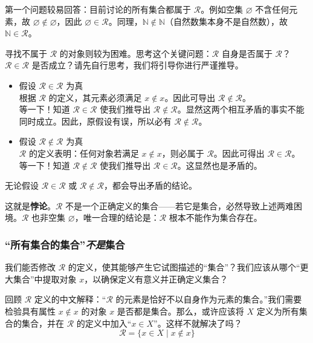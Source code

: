 第一个问题较易回答：目前讨论的所有集合都属于 $\mathcal{R}$。例如空集 $\varnothing$ 不含任何元素，故 $\varnothing \notin \varnothing$，因此 $\varnothing \in \mathcal{R}$。同理，$\mathbb{N} \notin \mathbb{N}$（自然数集本身不是自然数），故 $\mathbb{N} \in \mathcal{R}$。

寻找不属于 $\mathcal{R}$ 的对象则较为困难。思考这个关键问题：$\mathcal{R}$ 自身是否属于 $\mathcal{R}$？$\mathcal{R} \in \mathcal{R}$ 是否成立？请先自行思考，我们将引导你进行严谨推导。

\begin{itemize}
    \item 假设 $\mathcal{R} \in \mathcal{R}$ 为真 \\
    根据 $\mathcal{R}$ 的定义，其元素必须满足 $x \notin x$。因此可导出 $\mathcal{R} \notin \mathcal{R}$。\\
    等一下！知道 $\mathcal{R} \in \mathcal{R}$ 使我们推导出 $\mathcal{R} \notin \mathcal{R}$。显然这两个相互矛盾的事实不能同时成立。因此，原假设有误，所以必有 $\mathcal{R} \notin \mathcal{R}$。
    \item 假设 $\mathcal{R} \notin \mathcal{R}$ 为真 \\
    $\mathcal{R}$ 的定义表明：任何对象若满足 $x \notin x$，则必属于 $\mathcal{R}$。因此可得出 $\mathcal{R} \in \mathcal{R}$。\\
    等一下！知道 $\mathcal{R} \notin \mathcal{R}$ 使我们推导出 $\mathcal{R} \in \mathcal{R}$。这显然也是矛盾的。
\end{itemize}
无论假设 $\mathcal{R} \in \mathcal{R}$ 或 $\mathcal{R} \notin \mathcal{R}$，都会导出矛盾的结论。

这就是\textbf{悖论}。$\mathcal{R}$ 不是一个正确定义的集合——若它是集合，必然导致上述两难困境。$\mathcal{R}$ 也非空集 $\varnothing$，唯一合理的结论是：$\mathcal{R}$ 根本不能作为集合存在。

\subsubsection*{``所有集合的集合''\emph{不是}集合}

我们能否修改 $\mathcal{R}$ 的定义，使其能够产生它试图描述的``集合''？我们应该从哪个``更大集合''中提取对象 $x$，以确保定义有意义并正确定义集合？

回顾 $\mathcal{R}$ 定义的中文解释：``$\mathcal{R}$ 的元素是恰好不以自身作为元素的集合。''我们需要检验具有属性 $x \notin x$ 的对象 $x$ 是否都是集合。那么，或许应该将 $X$ 定义为所有集合的集合，并在 $\mathcal{R}$ 的定义中加入``$x \in X$''。这样不就解决了吗？
\[\mathcal{R} = \{x \in X \mid x \notin x\}\]

